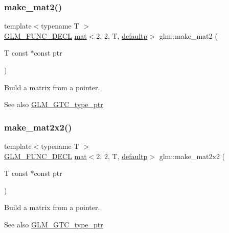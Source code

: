 \subsubsection{\texorpdfstring{make\+\_\+mat2()}{make\_mat2()}}
{\footnotesize\ttfamily template$<$typename T $>$ \\
\mbox{\hyperlink{setup_8hpp_ab2d052de21a70539923e9bcbf6e83a51}{G\+L\+M\+\_\+\+F\+U\+N\+C\+\_\+\+D\+E\+CL}} \mbox{\hyperlink{structglm_1_1mat}{mat}}$<$2, 2, T, \mbox{\hyperlink{namespaceglm_a36ed105b07c7746804d7fdc7cc90ff25a9d21ccd8b5a009ec7eb7677befc3bf51}{defaultp}}$>$ glm\+::make\+\_\+mat2 (\begin{DoxyParamCaption}\item[{T const $\ast$const}]{ptr }\end{DoxyParamCaption})}

Build a matrix from a pointer. \begin{DoxySeeAlso}{See also}
\mbox{\hyperlink{group__gtc__type__ptr}{G\+L\+M\+\_\+\+G\+T\+C\+\_\+type\+\_\+ptr}} 
\end{DoxySeeAlso}
\mbox{\label{group__gtc__type__ptr_gae49e1c7bcd5abec74d1c34155031f663}} 
\subsubsection{\texorpdfstring{make\+\_\+mat2x2()}{make\_mat2x2()}}
{\footnotesize\ttfamily template$<$typename T $>$ \\
\mbox{\hyperlink{setup_8hpp_ab2d052de21a70539923e9bcbf6e83a51}{G\+L\+M\+\_\+\+F\+U\+N\+C\+\_\+\+D\+E\+CL}} \mbox{\hyperlink{structglm_1_1mat}{mat}}$<$2, 2, T, \mbox{\hyperlink{namespaceglm_a36ed105b07c7746804d7fdc7cc90ff25a9d21ccd8b5a009ec7eb7677befc3bf51}{defaultp}}$>$ glm\+::make\+\_\+mat2x2 (\begin{DoxyParamCaption}\item[{T const $\ast$const}]{ptr }\end{DoxyParamCaption})}

Build a matrix from a pointer. \begin{DoxySeeAlso}{See also}
\mbox{\hyperlink{group__gtc__type__ptr}{G\+L\+M\+\_\+\+G\+T\+C\+\_\+type\+\_\+ptr}} 
\end{DoxySeeAlso}
\mbox{\label{group__gtc__type__ptr_ga21982104164789cf8985483aaefc25e8}} 
